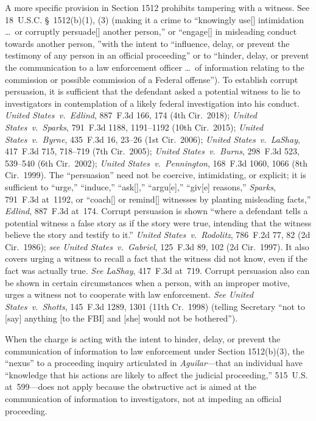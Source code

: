 A more specific provision in Section 1512 prohibits tampering with a witness.
See 18~U.S.C. \S~1512(b)(1), (3) (making it a crime to ``knowingly use[] intimidation \dots\ or corruptly persuade[] another person,'' or ``engage[] in misleading conduct towards another person, ''with the intent to ``influence, delay, or prevent the testimony of any person in an official proceeding'' or to ``hinder, delay, or prevent the communication to a law enforcement officer \dots\ of information relating to the commission or possible commission of a Federal offense'').
To establish corrupt persuasion, it is sufficient that the defendant asked a potential witness to lie to investigators in contemplation of a likely federal investigation into his conduct.
\textit{United States~v.\ Edlind}, 887~F.3d 166, 174 (4th Cir.~2018);
\textit{United States~v.\ Sparks}, 791~F.3d 1188, 1191--1192 (10th Cir.~2015);
\textit{United States~v.\ Byrne}, 435~F.3d 16, 23--26 (1st Cir.~2006);
\textit{United States~v.\ LaShay}, 417~F.3d 715, 718--719 (7th Cir.~2005);
\textit{United States~v.\ Burns}, 298~F.3d 523, 539--540 (6th Cir.~2002);
\textit{United States~v.\ Pennington}, 168~F.3d 1060, 1066 (8th Cir.~1999).
The ``persuasion'' need not be coercive, intimidating, or explicit;
it is sufficient to ``urge,'' ``induce,'' ``ask[],'' ``argu[e],'' ``giv[e] reasons,''
\textit{Sparks}, 791~F.3d at~1192, or ``coach[] or remind[] witnesses by planting misleading facts,''
\textit{Edlind}, 887~F.3d at~174.
Corrupt persuasion is shown ``where a defendant tells a potential witness a false story as if the story were true, intending that the witness believe the story and testify to it.''
\textit{United States~v.\ Rodolitz}, 786~F.2d 77, 82 (2d Cir.~1986);
\textit{see United States~v.\ Gabriel}, 125~F.3d 89, 102 (2d Cir.~1997).
It also covers urging a witness to recall a fact that the witness did not know, even if the fact was actually true.
\textit{See LaShay}, 417~F.3d at~719.
Corrupt persuasion also can be shown in certain circumstances when a person, with an improper motive, urges a witness not to cooperate with law enforcement.
\textit{See United States~v.\ Shotts}, 145~F.3d 1289, 1301 (11th Cr.~1998) (telling Secretary ``not to [say] anything [to the FBI] and [she] would not be bothered'').

When the charge is acting with the intent to hinder, delay, or prevent the communication of information to law enforcement under Section 1512(b)(3), the ``nexus'' to a proceeding inquiry articulated in \textit{Aguilar}---that an individual have ``knowledge that his actions are likely to affect the judicial proceeding,'' 515~U.S. at~599---does not apply because the obstructive act is aimed at the communication of information to investigators, not at impeding an official proceeding.

